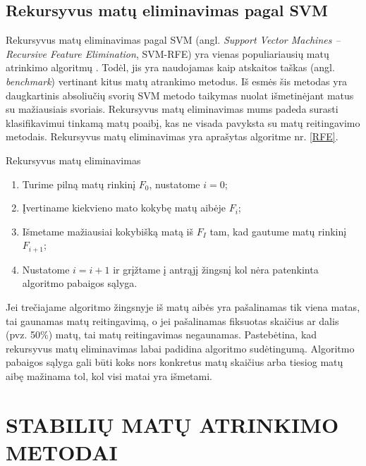 \subsection{Rekursyvus matų eliminavimas pagal SVM}

Rekursyvus matų eliminavimas pagal SVM (angl. \textit{Support Vector Machines -- Recursive Feature Elimination}, SVM-RFE) yra vienas populiariausių matų atrinkimo algoritmų \cite{guyon2002gene}. Todėl, jis yra naudojamas kaip atskaitos taškas (angl. \textit{benchmark}) vertinant kitus matų atrankimo metodus. Iš esmės šis metodas yra daugkartinis absoliučių svorių SVM metodo taikymas nuolat išmetinėjant matus su mažiausiais svoriais. Rekursyvus matų eliminavimas mums padeda surasti klasifikavimui tinkamą matų poaibį, kas ne visada pavyksta su matų reitingavimo metodais. Rekursyvus matų eliminavimas yra aprašytas algoritme nr. \ref{RFE}.
\begin{algorithm}
\caption{Rekursyvus matų eliminavimas}
\label{RFE}
 \begin{enumerate}
 \item Turime pilną matų rinkinį $F_0$, nustatome $i=0$;
 \item Įvertiname kiekvieno mato kokybę matų aibėje $F_i$;
 \item Išmetame mažiausiai kokybišką matą iš $F_I$ tam, kad gautume matų rinkinį $F_{i+1}$;
 \item Nustatome $i=i+1$ ir grįžtame į antrąjį žingsnį kol nėra patenkinta algoritmo pabaigos sąlyga.
\end{enumerate}
\end{algorithm}
Jei trečiajame algoritmo žingsnyje iš matų aibės yra pašalinamas tik viena matas, tai gaunamas matų reitingavimą, o jei pašalinamas fiksuotas skaičius ar dalis (pvz. 50\%) matų, tai matų reitingavimas negaunamas. Pastebėtina, kad rekursyvus matų eliminavimas labai padidina algoritmo sudėtingumą. Algoritmo pabaigos sąlyga gali būti koks nors konkretus matų skaičius arba tiesiog matų aibę mažinama tol, kol visi matai yra išmetami.

\newpage
\section{STABILIŲ MATŲ ATRINKIMO METODAI}
\label{stabiliu_matu_atrinkimo_metodai}

